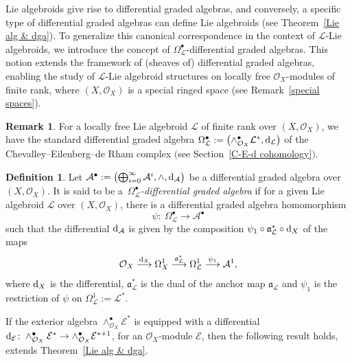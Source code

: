 \documentclass[pdftex]{sigma}
\numberwithin{equation}{section}
\theoremstyle{definition}
\newtheorem{Def}[Thm]{Definition}
\newtheorem{Rem}[Thm]{Remark}
\begin{document}
Lie algebroids give rise to differential graded algebras, and conversely, a specific type of differential graded algebras can define Lie algebroids (see Theorem~\ref{Lie alg & dga}). To generalize this canonical correspondence in the context of $\mathcal{L}$-Lie algebroids, we introduce the concept of $\Omega^{\bullet}_{\mathcal{L}}$-differential graded algebras. This notion extends the framework of (sheaves of) differential graded algebras, enabling the study of $\mathcal{L}$-Lie algebroid structures on locally free $\mathcal{O}_X$-modules of finite rank, where $(X, \mathcal{O}_X)$ is a special ringed space (see Remark~\ref{special spaces}).
\begin{Rem}
	For a locally free Lie algebroid $\mathcal{L}$ of finite rank over $(X,\mathcal{O}_X)$, we have the standard differential graded algebra $\Omega^{\bullet}_{\mathcal{L}}:=\bigl(\wedge^{\bullet}_{\mathcal{O}_X}\mathcal{L}^*,{\rm d}_{\mathcal{L}}\bigr)$ of the Chevalley--Eilenberg--de Rham complex $($see Section~\ref{C-E-d cohomology}$)$.
\end{Rem}
\begin{Def} Let $\mathcal{A}^{\bullet}:=\bigl(\bigoplus^{\infty}_{i=0} \mathcal{A}^i, \wedge, {\rm d}_{\mathcal{A}}\bigr)$ be a differential graded algebra over $(X,\mathcal{O}_X)$.
	It is said to be a~\emph{$\Omega^{\bullet}_{\mathcal{L}}$-differential graded algebra} if for a given Lie algebroid $\mathcal{L}$ over $(X,\mathcal{O}_X)$, there is a differential graded algebra homomorphism
\[
\psi\colon \ \Omega^{\bullet}_{\mathcal{L}} \rightarrow \mathcal{A}^{\bullet}
\]
	such that the differential ${\rm d}_{\mathcal{A}}$ is given by the composition $\psi_1 \circ \mathfrak{a}_{\mathcal{L}}^* \circ {\rm d}_X$ of the maps
\[
\mathcal{O}_X \overset{{\rm d}_X}{\longrightarrow}\Omega^1_X \overset{\mathfrak{a}_{\mathcal{L}}^*}{\longrightarrow} \Omega^1_{\mathcal{L}} \overset{\psi_1}{\longrightarrow} \mathcal{A}^1,
\]
	where ${\rm d}_X$ is the differential, $\mathfrak{a}_{\mathcal{L}}^*$ is the dual of the anchor map $\mathfrak{a}_{\mathcal{L}}$ and
	$\psi_1$ is the restriction of $\psi$ on $ \Omega^1_{\mathcal{L}}:= \mathcal{L}^*$.
\end{Def}

If the exterior algebra $\wedge_{\mathcal{O}_X}^\bullet \mathcal{E^*}$ is equipped with a differential ${\rm d}_{\mathcal{E}}\colon \wedge_{\mathcal{O}_X}^\bullet \mathcal{E^*} \rightarrow \wedge_{\mathcal{O}_X}^\bullet \mathcal{E}^{*+1}$, for an $\mathcal{O}_X$-module $\mathcal{E}$, then the following result holds, extends Theorem~\ref{Lie alg & dga}.
\end{document}

